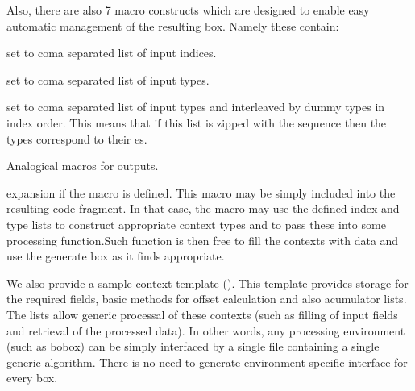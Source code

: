 Also, there are also 7 macro constructs which are designed to enable easy automatic management of the resulting box. Namely these contain:
\begin{description}
  \item {} set to coma separated list of input indices.
  \item {} set to coma separated list of input types.
  \item {} set to coma separated list of input types and interleaved by dummy types in index order. This means that if this list is zipped with the sequence  then the types correspond to their es.
  \item Analogical macros for outputs.
  \item {} expansion if the macro is defined. This macro may be simply included into the resulting code fragment. In that case, the macro may use the defined index and type lists to construct appropriate context types and to pass these into some processing function.Such function is then free to fill the contexts with data and use the generate box as it finds appropriate. 
\end{description}

We also provide a sample context template (). This template provides storage for the required fields, basic methods for offset calculation and also acumulator lists. The lists allow generic processal of these contexts (such as filling of input fields and retrieval of the processed data). In other words, any processing environment (such as bobox) can be simply interfaced by a single file containing a single generic algorithm. There is no need to generate environment-specific interface for every box.




